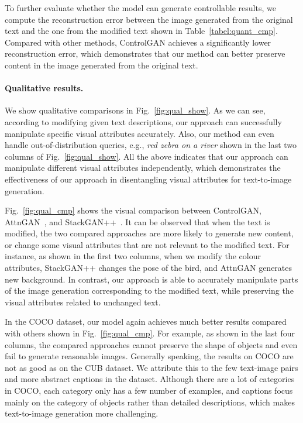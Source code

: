 \documentclass{article}
\begin{document}
To further evaluate whether the model can generate controllable results, we compute the  reconstruction error \cite{nam2018text} between the image generated from the original text and the one from the modified text shown in Table~\ref{tabel:quant_cmp}.
Compared with other methods, ControlGAN achieves a significantly lower reconstruction error, which demonstrates that our method can better preserve content in the image generated from the original text.

\paragraph{Qualitative results.}
We show qualitative comparisons in Fig.~\ref{fig:qual_show}.
As we can see, according to modifying given text descriptions, our approach can successfully manipulate specific visual attributes accurately. 
Also, our method can even handle out-of-distribution queries, e.g., \emph{red zebra on a river} shown in the last two columns of Fig.~\ref{fig:qual_show}.
All the above indicates that our approach can manipulate different visual attributes independently, which demonstrates the effectiveness of our approach in disentangling visual attributes for text-to-image generation.


Fig.~\ref{fig:qual_cmp} shows the visual comparison between ControlGAN, AttnGAN~\cite{xu2018attngan}, and StackGAN++~\cite{zhang2018stackgan++}. It can be observed that when the text is modified, the two compared approaches are more likely to generate new content, or change some visual attributes that are not relevant to the modified text. {For instance, as shown in the first two columns, when we modify the colour attributes, StackGAN++ changes the pose of the bird, and AttnGAN generates new background.}
In contrast, our approach is able to accurately manipulate parts of the image generation corresponding to the modified text, while preserving the visual attributes related to unchanged text.

In the COCO dataset, our model again achieves much better results compared with others shown in Fig.~\ref{fig:qual_cmp}. {For example, as shown in the last four columns, the compared approaches cannot preserve the shape of objects and even fail to generate reasonable images.}
Generally speaking, the results on COCO are not as good as on the CUB dataset. We attribute this to the few text-image pairs and more abstract captions in the dataset. Although there are a lot of categories in COCO, each category only has a few number of examples, and captions focus mainly on the category of objects rather than detailed descriptions, which makes text-to-image generation more challenging. 
\end{document}
